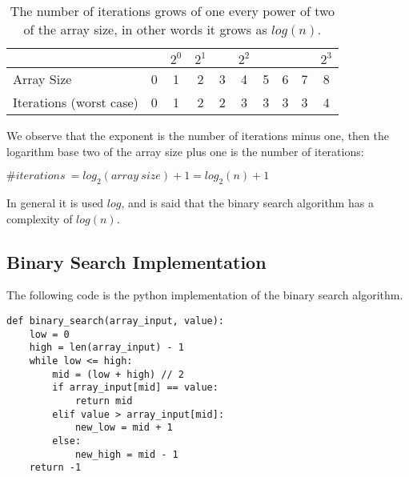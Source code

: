\begin{table}[H]
\caption[Binary search complexity.]{The number of iterations grows of one every power of two of the array size, in other words it grows as \(log(n)\).}
\label{binarysearchefficiency}
\centering
\begin{tabular}{ | l | c | c | c | c | c | c | c | c | c |}
   
    \multicolumn{1}{l}{} & \multicolumn{1}{c}{} & 
    \multicolumn{1}{c}{\(2^{0}\)} & \multicolumn{1}{c}{\(2^{1}\)} &
    \multicolumn{1}{c}{} & \multicolumn{1}{c}{\(2^{2}\)} & 
    \multicolumn{1}{c}{} & \multicolumn{1}{c}{}          & 
    \multicolumn{1}{c}{} & \multicolumn{1}{c}{\(2^{3}\)} \\
    \hline
	Array Size & 0 & \cellcolor{LightCyan} 1 & \cellcolor{LightCyan} 2 & 3 & \cellcolor{LightCyan} 4  & 5 & 6 & 7 & \cellcolor{LightCyan} 8 \\
    \hline
	Iterations (worst case) & 0 & \cellcolor{LightCyan} 1 & \cellcolor{LightCyan} 2 & 2 & \cellcolor{LightCyan} 3 & 3 & 3 & 3 & \cellcolor{LightCyan} 4 \\
	\hline	
\end{tabular}
\end{table}

We observe that the exponent is the number of iterations minus one, then the logarithm base two of the array size plus one is the number of iterations:
\begin{center}
\(\#iterations\ = log_{2}(array\ size) + 1 = log_{2}(n) + 1\)
\end{center}
In general it is used \(log\), and is said that the binary search algorithm has a complexity of \(log(n)\). 

\subsection{Binary Search Implementation}
The following code is the python implementation of the binary search algorithm.
\begin{lstlisting}[firstnumber=1, caption={Binary search python implementation.}]
def binary_search(array_input, value):
	low = 0
	high = len(array_input) - 1
	while low <= high:
		mid = (low + high) // 2
		if array_input[mid] == value:
			return mid
		elif value > array_input[mid]:
			new_low = mid + 1
		else:
			new_high = mid - 1
	return -1
\end{lstlisting}

